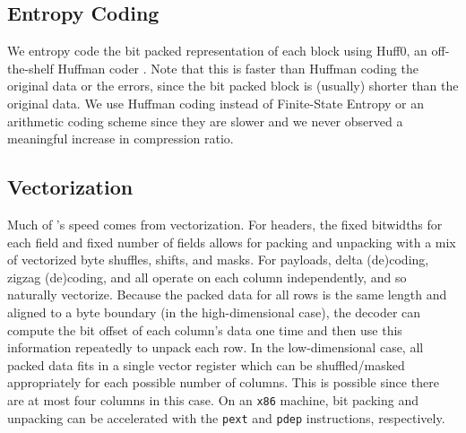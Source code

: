 \subsection{Entropy Coding}

We entropy code the bit packed representation of each block using Huff0, an off-the-shelf Huffman coder \cite{fse}. Note that this is faster than Huffman coding the original data or the errors, since the bit packed block is (usually) shorter than the original data. We use Huffman coding instead of Finite-State Entropy \cite{fse} or an arithmetic coding scheme since they are slower and we never observed a meaningful increase in compression ratio.

\subsection{Vectorization}

Much of \mine's speed comes from vectorization. For headers, the fixed bitwidths for each field and fixed number of fields allows for packing and unpacking with a mix of vectorized byte shuffles, shifts, and masks. For payloads, delta (de)coding, zigzag (de)coding, and \fire all operate on each column independently, and so naturally vectorize. Because the packed data for all rows is the same length and aligned to a byte boundary (in the high-dimensional case), the decoder can compute the bit offset of each column's data one time and then use this information repeatedly to unpack each row. In the low-dimensional case, all packed data fits in a single vector register which can be shuffled/masked appropriately for each possible number of columns. This is possible since there are at most four columns in this case. On an \texttt{x86} machine, bit packing and unpacking can be accelerated with the \texttt{pext} and \texttt{pdep} instructions, respectively.
